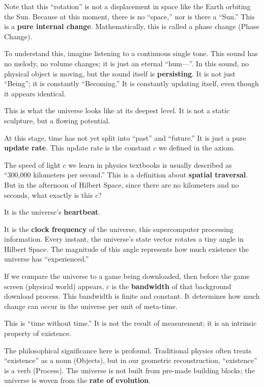 \documentclass[11pt,a4paper,twoside]{book}
\begin{document}
Note that this ``rotation'' is not a displacement in space like the Earth orbiting the Sun. Because at this moment, there is no ``space,'' nor is there a ``Sun.'' This is a \textbf{pure internal change}. Mathematically, this is called a phase change (Phase Change).

To understand this, imagine listening to a continuous single tone. This sound has no melody, no volume changes; it is just an eternal ``hum---''. In this sound, no physical object is moving, but the sound itself is \textbf{persisting}. It is not just ``Being''; it is constantly ``Becoming.'' It is constantly updating itself, even though it appears identical.

This is what the universe looks like at its deepest level. It is not a static sculpture, but a flowing potential.

At this stage, time has not yet split into ``past'' and ``future.'' It is just a pure \textbf{update rate}. This update rate is the constant $c$ we defined in the axiom.

The speed of light $c$ we learn in physics textbooks is usually described as ``300,000 kilometers per second.'' This is a definition about \textbf{spatial traversal}. But in the afternoon of Hilbert Space, since there are no kilometers and no seconds, what exactly is this $c$?

It is the universe's \textbf{heartbeat}.

It is the \textbf{clock frequency} of the universe, this supercomputer processing information. Every instant, the universe's state vector rotates a tiny angle in Hilbert Space. The magnitude of this angle represents how much existence the universe has ``experienced.''

If we compare the universe to a game being downloaded, then before the game screen (physical world) appears, $c$ is the \textbf{bandwidth} of that background download process. This bandwidth is finite and constant. It determines how much change can occur in the universe per unit of meta-time.

This is ``time without time.'' It is not the result of measurement; it is an intrinsic property of existence.

The philosophical significance here is profound. Traditional physics often treats ``existence'' as a noun (Objects), but in our geometric reconstruction, ``existence'' is a verb (Process). The universe is not built from pre-made building blocks; the universe is woven from the \textbf{rate of evolution}.
\end{document}

